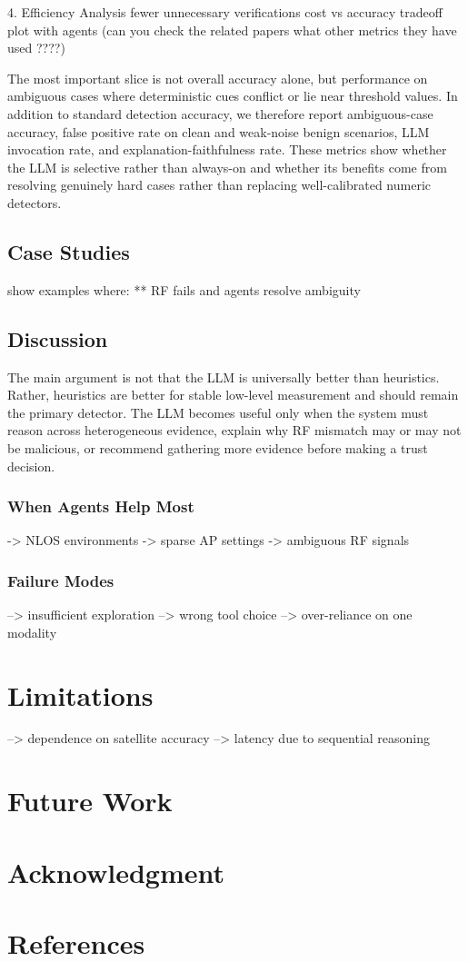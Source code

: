 \documentclass[10pt, twocolumn, letterpaper]{article}
\begin{document}
4. Efficiency Analysis
fewer unnecessary verifications
cost vs accuracy tradeoff plot with agents (can you check the related papers what other metrics they have used ????)

The most important slice is not overall accuracy alone, but performance on ambiguous cases where deterministic cues conflict or lie near threshold values. In addition to standard detection accuracy, we therefore report ambiguous-case accuracy, false positive rate on clean and weak-noise benign scenarios, LLM invocation rate, and explanation-faithfulness rate. These metrics show whether the LLM is selective rather than always-on and whether its benefits come from resolving genuinely hard cases rather than replacing well-calibrated numeric detectors.


\subsection{Case Studies}

show examples where:
** RF fails and agents resolve ambiguity





\subsection{Discussion}

The main argument is not that the LLM is universally better than heuristics. Rather, heuristics are better for stable low-level measurement and should remain the primary detector. The LLM becomes useful only when the system must reason across heterogeneous evidence, explain why RF mismatch may or may not be malicious, or recommend gathering more evidence before making a trust decision.


\subsubsection{When Agents Help Most}
-> NLOS environments
-> sparse AP settings
-> ambiguous RF signals


\subsubsection{Failure Modes}


--> insufficient exploration
--> wrong tool choice
--> over-reliance on one modality


\section{Limitations}
--> dependence on satellite accuracy
--> latency due to sequential reasoning
\section{Future Work}




\section*{Acknowledgment}

\section*{References}
\end{document}
